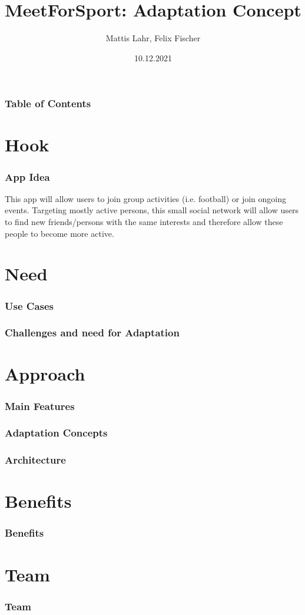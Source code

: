 \documentclass[aspectratio=169]{beamer}
\title{MeetForSport: Adaptation Concept}
\author{Mattis Lahr, Felix Fischer}
\date{10.12.2021}
\begin{document}
\maketitle



\begin{frame}
    \frametitle{Table of Contents}
    \tableofcontents
\end{frame}



\section{Hook}
\begin{frame}
\frametitle{App Idea}
This app will allow users to join group activities (i.e. football) or join ongoing events.
Targeting mostly active persons, this small social network will allow users  to find new friends/persons with the same interests and therefore allow these people to become more active.
\end{frame}

\section{Need}
	\begin{frame}
		\frametitle{Use Cases}
	\end{frame}

	\begin{frame}
		\frametitle{Challenges and need for Adaptation}
	\end{frame}

\section{Approach}

	\begin{frame}
		\frametitle{Main Features}
	\end{frame}

	\begin{frame}
		\frametitle{Adaptation Concepts}
	\end{frame}

	\begin{frame}
		\frametitle{Architecture}
	\end{frame}

\section{Benefits}

	\begin{frame}
		\frametitle{Benefits}
	\end{frame}

\section{Team}

	\begin{frame}
		\frametitle{Team}
	\end{frame}
\end{document}
